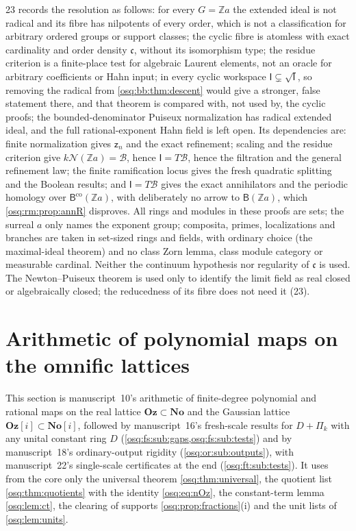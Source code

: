 \documentclass[11pt,letterpaper]{article}
\numberwithin{equation}{section}
\theoremstyle{definition}
\theoremstyle{remark}
\theoremstyle{plain}
\newcommand{\No}{\mathbf{No}}
\newcommand{\Oz}{\mathbf{Oz}}
\newcommand{\SC}{\No[i]}
\newcommand{\GOz}{\Oz[i]}
\newcommand{\Z}{\mathbb Z}
\newcommand{\NN}{\mathcal N}         %
\begin{document}
23 records the resolution as follows: for every $G=\Z a$ the extended ideal is not radical and its fibre has nilpotents of every order, which is not
a classification for arbitrary ordered groups or support classes; the cyclic fibre is atomless with exact cardinality and order density $\mathfrak c$,
without its isomorphism type; the residue criterion is a finite-place test for algebraic Laurent elements, not an oracle for arbitrary coefficients or
Hahn input; in every cyclic workspace $\mathsf I\subsetneq\sqrt{\mathsf I}$, so removing the radical from \cref{osq:bb:thm:descent} would give a stronger,
false statement there, and that theorem is compared with, not used by, the cyclic proofs; the bounded-denominator Puiseux normalization has radical
extended ideal, and the full rational-exponent Hahn field is left open. Its dependencies are: finite normalization gives $\mathsf z_n$ and the exact
refinement; scaling and the residue criterion give $k\NN(\Z a)=\mathscr B$, hence $\mathsf I=T\mathscr B$, hence the filtration and the general refinement law;
the finite ramification locus gives the fresh quadratic splitting and the Boolean results; and $\mathsf I=T\mathscr B$ gives the exact annihilators and the
periodic homology over $\mathsf B^{\mathrm{co}}(\Z a)$, with deliberately no arrow to $\mathsf B(\Z a)$, which \cref{osq:rm:prop:annR} disproves. All rings and modules
in these proofs are sets; the surreal $a$ only names the exponent group; composita, primes, localizations and branches are taken in set-sized rings and
fields, with ordinary choice (the maximal-ideal theorem) and no class Zorn lemma, class module category or measurable cardinal. Neither the continuum
hypothesis nor regularity of $\mathfrak c$ is used. The Newton--Puiseux theorem is used only to identify the limit field as real closed or algebraically
closed; the reducedness of its fibre does not need it (23).

\section{Arithmetic of polynomial maps on the omnific lattices}\label{osq:sec:polynomial}

This section is manuscript~10's arithmetic of finite-degree polynomial and rational maps on
the real lattice $\Oz\subset\No$ and the Gaussian lattice $\GOz\subset\SC$, followed by manuscript~16's
fresh-scale results for $D+\Pi_k$ with any unital constant ring $D$
(\cref{osq:fs:sub:gaps,osq:fs:sub:tests}) and by manuscript~18's ordinary-output rigidity
(\cref{osq:or:sub:outputs}), with manuscript~22's single-scale certificates at the end (\cref{osq:ft:sub:tests}). It uses from the
core only the universal theorem \cref{osq:thm:universal}, the quotient list
\cref{osq:thm:quotients} with the identity \eqref{osq:eq:nOz}, the constant-term lemma
\cref{osq:lem:ct}, the clearing of supports \cref{osq:prop:fractions}(i) and the unit lists of \cref{osq:lem:units}.
\end{document}
